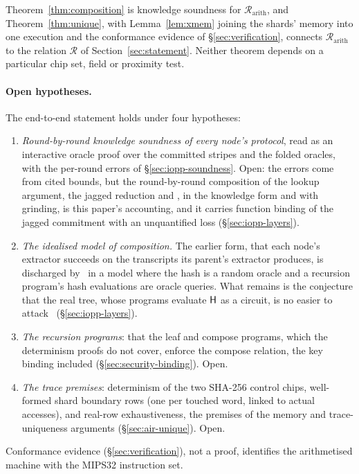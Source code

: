 Theorem~\ref{thm:composition} is knowledge soundness for $\mathcal R_{\mathrm{arith}}$, and Theorem~\ref{thm:unique}, with Lemma~\ref{lem:xmem} joining the shards' memory into one execution and the conformance evidence of \S\ref{sec:verification}, connects $\mathcal R_{\mathrm{arith}}$ to the relation $\mathcal R$ of Section~\ref{sec:statement}. Neither theorem depends on a particular chip set, field or proximity test.

\paragraph{Open hypotheses.} The end-to-end statement holds under four hypotheses:
\begin{enumerate}
  \item \emph{Round-by-round knowledge soundness of every node's protocol}, read as an interactive oracle proof over the committed stripes and the folded oracles, with the per-round errors of \S\ref{sec:iopp-soundness}. Open: the errors come from cited bounds, but the round-by-round composition of the lookup argument, the jagged reduction and \WHIR{}, in the knowledge form and with grinding, is this paper's accounting, and it carries function binding of the jagged \WHIR{} commitment with an unquantified loss (\S\ref{sec:iopp-layers}).
  \item \emph{The idealised model of composition.} The earlier form, that each node's extractor succeeds on the transcripts its parent's extractor produces, is discharged by~\citep[Thm.~5.1]{cgsy24} in a model where the hash is a random oracle and a recursion program's hash evaluations are oracle queries. What remains is the conjecture that the real tree, whose programs evaluate $\mathsf{H}$ as a circuit, is no easier to attack~\citep[\S2.3]{cgsy24} (\S\ref{sec:iopp-layers}).
  \item \emph{The recursion programs}: that the leaf and compose programs, which the determinism proofs do not cover, enforce the compose relation, the key binding included (\S\ref{sec:security-binding}). Open.
  \item \emph{The trace premises}: determinism of the two SHA-256 control chips, well-formed shard boundary rows (one per touched word, linked to actual accesses), and real-row exhaustiveness, the premises of the memory and trace-uniqueness arguments (\S\ref{sec:air-unique}). Open.
\end{enumerate}
Conformance evidence (\S\ref{sec:verification}), not a proof, identifies the arithmetised machine with the MIPS32 instruction set.

